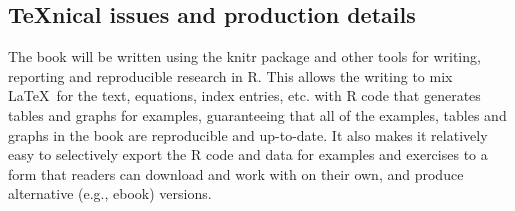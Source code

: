 \documentclass{article}
\newcommand{\R}{\textsf{R}\xspace}
\newcommand{\pkg}[1]{{\normalfont\fontseries{b}\selectfont #1}}
\begin{document}

%


%
%
\subsection*{\TeX nical issues and production details}
The book will be written using the \pkg{knitr} package and other tools for writing, reporting
and reproducible research in \R.
This allows the writing to mix
\LaTeX\ for the text, equations, index entries, etc. with \R code that generates tables and
graphs for examples, guaranteeing that all of the examples,
tables and graphs in the book are reproducible and up-to-date.
It also makes it relatively easy to selectively export the \R code and data for
examples and exercises to a form that readers can download and work with on their own,
and produce alternative (e.g., ebook) versions.
\end{document}
